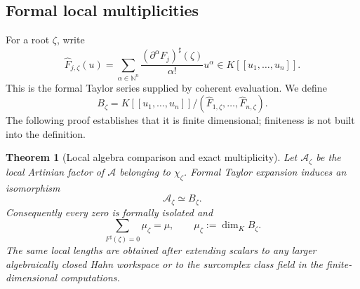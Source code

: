 \documentclass[11pt,letterpaper]{article}
\newtheorem{theorem}{Theorem}[section]
\theoremstyle{definition}
\theoremstyle{remark}
\newcommand{\N}{\mathbb N}
\newcommand{\sh}{^{\sharp}}
\begin{document}
\subsection{Formal local multiplicities}
For a root $\zeta$, write
\[
 \widehat F_{j,\zeta}(u)=
   \sum_{\alpha\in\N^n}
    \frac{(\partial^\alpha F_j)\sh(\zeta)}{\alpha!}u^\alpha
       \in K[[u_1,\ldots,u_n]].
\]
This is the formal Taylor series supplied by coherent evaluation. We define
\[
 B_\zeta=K[[u_1,\ldots,u_n]]/
          (\widehat F_{1,\zeta},\ldots,\widehat F_{n,\zeta}).
\]
The following proof establishes that it is finite dimensional; finiteness is not built into the definition.

\begin{theorem}[Local algebra comparison and exact multiplicity]\label{thm:length}
Let $\mathcal A_\zeta$ be the local Artinian factor of $\mathcal A$ belonging to $\chi_\zeta$. Formal Taylor expansion induces an isomorphism
\begin{equation}\label{eq:localiso}
 \mathcal A_\zeta\simeq B_\zeta.
\end{equation}
Consequently every zero is formally isolated and
\begin{equation}\label{eq:exactlength}
 \sum_{F\sh(\zeta)=0}\mu_\zeta=\mu,
 \qquad \mu_\zeta:=\dim_K B_\zeta.
\end{equation}
The same local lengths are obtained after extending scalars to any larger algebraically closed Hahn workspace or to the surcomplex class field in the finite-dimensional computations.
\end{theorem}
\end{document}
